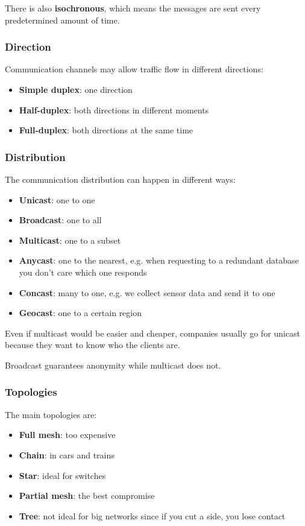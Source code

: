 \begin{note}
	There is also \textbf{isochronous}, which means the messages are sent every predetermined amount of time.
\end{note}

\subsubsection{Direction}
Communication channels may allow traffic flow in different directions:
\begin{itemize}
	\item \textbf{Simple duplex}: one direction
	\item \textbf{Half-duplex}: both directions in different moments
	\item \textbf{Full-duplex}: both directions at the same time
\end{itemize}
\subsubsection{Distribution}
The communication distribution can happen in different ways:
\begin{itemize}
	\item \textbf{Unicast}: one to one
	\item \textbf{Broadcast}: one to all
	\item \textbf{Multicast}: one to a subset
	\item \textbf{Anycast}: one to the nearest, e.g. when requesting to a redundant database you don't care which one responds
	\item \textbf{Concast}: many to one, e.g. we collect sensor data and send it to one
	\item \textbf{Geocast}: one to a certain region
\end{itemize}
\begin{note}
	Even if multicast would be easier and cheaper, companies usually go for unicast because they want to know who the clients are.
\end{note}

\begin{note}
	Broadcast guarantees anonymity while multicast does not.
\end{note}

\subsubsection{Topologies}
The main topologies are:
\begin{itemize}
	\item \textbf{Full mesh}: too expensive
	\item \textbf{Chain}: in cars and trains
	\item \textbf{Star}: ideal for switches
	\item \textbf{Partial mesh}: the best compromise
	\item \textbf{Tree}: not ideal for big networks since if you cut a side, you lose contact
\end{itemize}

